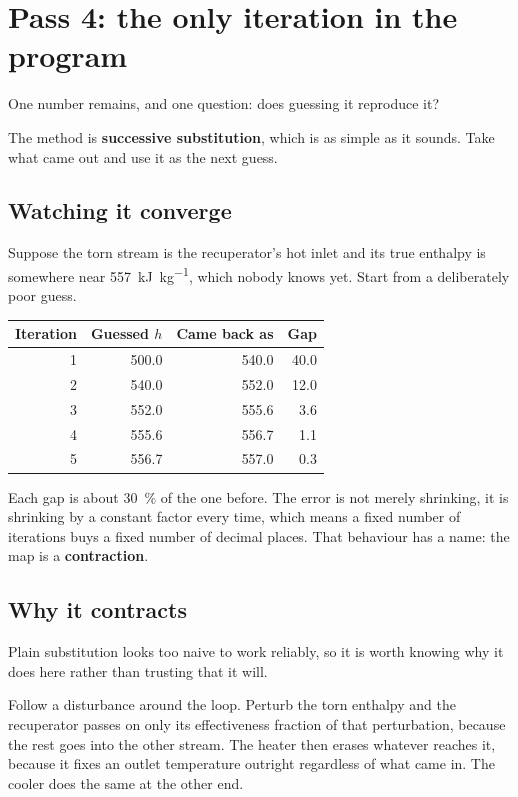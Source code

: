 \documentclass[11pt,a4paper]{report}
\begin{document}
\section{Pass 4: the only iteration in the program}
\label{sec:tearloop}

One number remains, and one question: does guessing it reproduce it?

The method is \textbf{successive substitution}, which is as simple as it
sounds. Take what came out and use it as the next guess.

\subsection{Watching it converge}

Suppose the torn stream is the recuperator's hot inlet and its true enthalpy
is somewhere near \SI{557}{\kilo\joule\per\kilogram}, which nobody knows
yet. Start from a deliberately poor guess.

\begin{center}
\begin{tabular}{@{}rrrr@{}}
\toprule
Iteration & Guessed $h$ & Came back as & Gap \\
\midrule
1 & 500.0 & 540.0 & 40.0 \\
2 & 540.0 & 552.0 & 12.0 \\
3 & 552.0 & 555.6 &  3.6 \\
4 & 555.6 & 556.7 &  1.1 \\
5 & 556.7 & 557.0 &  0.3 \\
\bottomrule
\end{tabular}
\end{center}

Each gap is about \SI{30}{\percent} of the one before. The error is not
merely shrinking, it is shrinking by a constant factor every time, which
means a fixed number of iterations buys a fixed number of decimal places.
That behaviour has a name: the map is a \textbf{contraction}.


\subsection{Why it contracts}

Plain substitution looks too naive to work reliably, so it is worth knowing
why it does here rather than trusting that it will.

Follow a disturbance around the loop. Perturb the torn enthalpy and the
recuperator passes on only its effectiveness fraction of that perturbation,
because the rest goes into the other stream. The heater then erases
whatever reaches it, because it fixes an outlet temperature outright
regardless of what came in. The cooler does the same at the other end.
\end{document}

